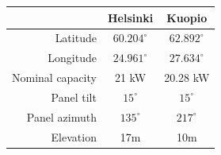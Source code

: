 






\begin{table}[H]
\centering
\begin{tabular}{r|cc} \hline\hline

 & Helsinki & Kuopio\\ \hline
 Latitude & $60.204^\circ$ & $62.892^\circ$ \\
 Longitude & $24.961^\circ$  &  $27.634^\circ$\\
 Nominal capacity &21 kW & 20.28 kW \\
 Panel tilt & $15^\circ$ & $15^\circ$ \\
 Panel azimuth & $135^\circ$ & $217^\circ$ \\
 Elevation & 17m & 10m\\
\hline\hline
\end{tabular}
\label{table_fmi_helsinki_kuopio_parameters}
\end{table}






